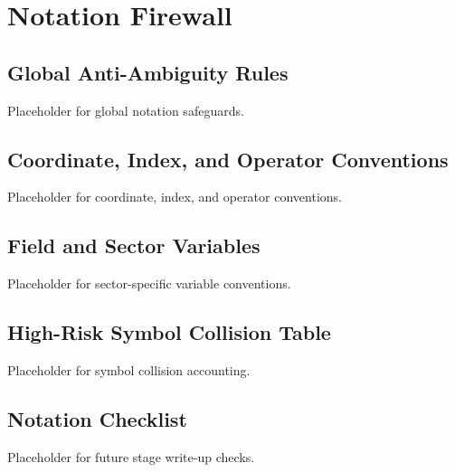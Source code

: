 \chapter{Notation Firewall}
\label{chap:notation-firewall}


\section{Global Anti-Ambiguity Rules}
\label{sec:notation-global-rules}

Placeholder for global notation safeguards.

\section{Coordinate, Index, and Operator Conventions}
\label{sec:notation-coordinates-indices}

Placeholder for coordinate, index, and operator conventions.

\section{Field and Sector Variables}
\label{sec:notation-field-sector-variables}

Placeholder for sector-specific variable conventions.

\section{High-Risk Symbol Collision Table}
\label{sec:notation-symbol-collisions}

Placeholder for symbol collision accounting.

\section{Notation Checklist}
\label{sec:notation-checklist}

Placeholder for future stage write-up checks.
